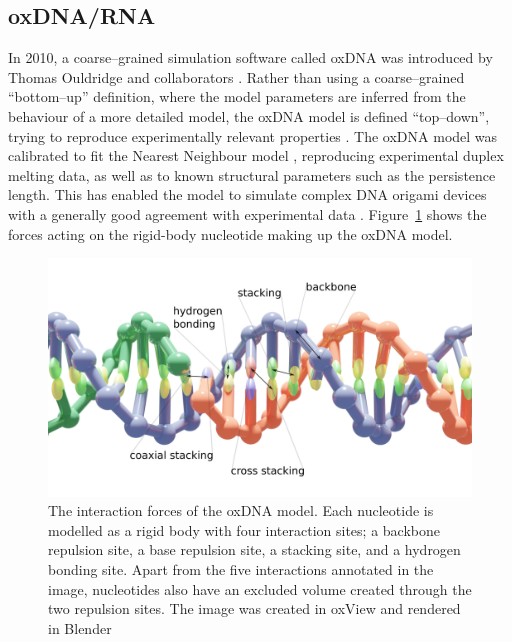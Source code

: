 \subsection{oxDNA/RNA}
\label{sec:oxDNA}

In 2010, a coarse--grained simulation software called oxDNA was introduced by Thomas Ouldridge and collaborators \cite{ouldridge2010dna}. Rather than using a coarse--grained ``bottom--up'' definition, where the model parameters are inferred from the behaviour of a more detailed model, the oxDNA model is defined ``top--down'', trying to reproduce experimentally relevant properties \cite{sengar2021primer}. The oxDNA model was calibrated to fit the Nearest Neighbour model \cite{santalucia1998unified}, reproducing experimental duplex melting data, as well as to known structural parameters such as the persistence length. This has enabled the model to simulate complex DNA origami devices with a generally good agreement with experimental data \cite{sharma2017characterizing}. Figure~\ref{fig:oxDNA} shows the forces acting on the rigid-body nucleotide making up the oxDNA model.

\begin{figure}[ht]
  \begin{center}
      \includegraphics[width=\textwidth]{figures/oxdna_annot.png}
      \caption{The interaction forces of the oxDNA model. Each nucleotide is modelled as a rigid body with four interaction sites; a backbone repulsion site, a base repulsion site, a stacking site, and a hydrogen bonding site. Apart from the five interactions annotated in the image, nucleotides also have an excluded volume created through the two repulsion sites. The image was created in oxView and rendered in Blender}
      \label{fig:oxDNA}
      \end{center}
  \end{figure}

